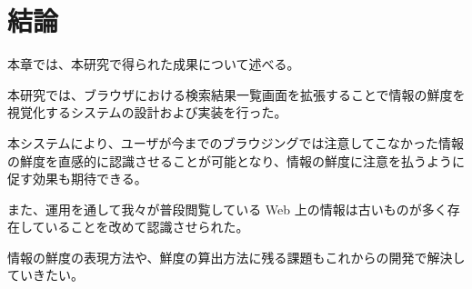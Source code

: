 \chapter{結論}
\label{chap:conclusion}

本章では、本研究で得られた成果について述べる。

\newpage

本研究では、ブラウザにおける検索結果一覧画面を拡張することで情報の鮮度を視覚化するシステムの設計および実装を行った。

本システムにより、ユーザが今までのブラウジングでは注意してこなかった情報の鮮度を直感的に認識させることが可能となり、情報の鮮度に注意を払うように促す効果も期待できる。

また、運用を通して我々が普段閲覧している Web 上の情報は古いものが多く存在していることを改めて認識させられた。

情報の鮮度の表現方法や、鮮度の算出方法に残る課題もこれからの開発で解決していきたい。
